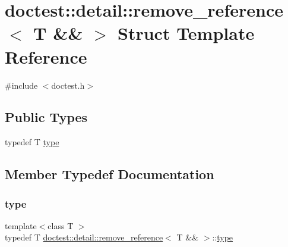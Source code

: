 \hypertarget{structdoctest_1_1detail_1_1remove__reference_3_01_t_01_6_6_01_4}{}\section{doctest\+:\+:detail\+:\+:remove\+\_\+reference$<$ T \&\& $>$ Struct Template Reference}
\label{structdoctest_1_1detail_1_1remove__reference_3_01_t_01_6_6_01_4}


{\ttfamily \#include $<$doctest.\+h$>$}

\subsection*{Public Types}
\begin{DoxyCompactItemize}
\item 
typedef T \hyperlink{structdoctest_1_1detail_1_1remove__reference_3_01_t_01_6_6_01_4_af5f63a14f4e74e0c3c733c00e2f37213}{type}
\end{DoxyCompactItemize}


\subsection{Member Typedef Documentation}
\mbox{\label{structdoctest_1_1detail_1_1remove__reference_3_01_t_01_6_6_01_4_af5f63a14f4e74e0c3c733c00e2f37213}} 
\subsubsection{\texorpdfstring{type}{type}}
{\footnotesize\ttfamily template$<$class T $>$ \\
typedef T \hyperlink{structdoctest_1_1detail_1_1remove__reference}{doctest\+::detail\+::remove\+\_\+reference}$<$ T \&\& $>$\+::\hyperlink{structdoctest_1_1detail_1_1remove__reference_3_01_t_01_6_6_01_4_af5f63a14f4e74e0c3c733c00e2f37213}{type}}

